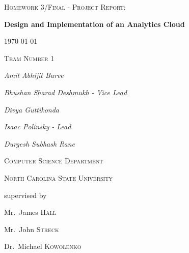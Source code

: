 \documentclass[12pt,a4paper]{article}
\begin{document}
  \begin{titlepage}
    \centering
    {\scshape\Large Homework 3/Final - Project Report:\par}
    {\huge\bfseries Design and Implementation of an Analytics Cloud\par}
    \vspace{1.4cm}
    {\large\scshape \today\par}
    {\large\scshape Team Number 1\par}
    \vspace{1.4cm}
    {\Large\itshape Amit Abhijit Barve\par}
    {\Large\itshape Bhushan Sharad Deshmukh - Vice Lead\par}
    {\Large\itshape Divya Guttikonda\par}
    {\Large\itshape Isaac Polinsky - Lead\par}
    {\Large\itshape Durgesh Subhash Rane\par}
    \vspace{1.4cm}
    {\Large\scshape Computer Science Department\par}
    {\Large\scshape North Carolina State University\par}
    \vspace{1.4cm}
    supervised by\par
    Mr.~James \textsc{Hall}\par
    Mr.~John \textsc{Streck}\par
    Dr.~Michael \textsc{Kowolenko}
    \vfill
  \end{titlepage}

  
  \nocite{*}
  \newpage
  \tableofcontents
  \newpage
  \listoffigures
  \newpage
  \listoftables
  \newpage

  
  \newpage
  
  \newpage
  
  \newpage
  
  \newpage
  
  \newpage
  
  \newpage


  \printbibliography
  \newpage

  \begin{appendices}
    
  \end{appendices}
\end{document}
